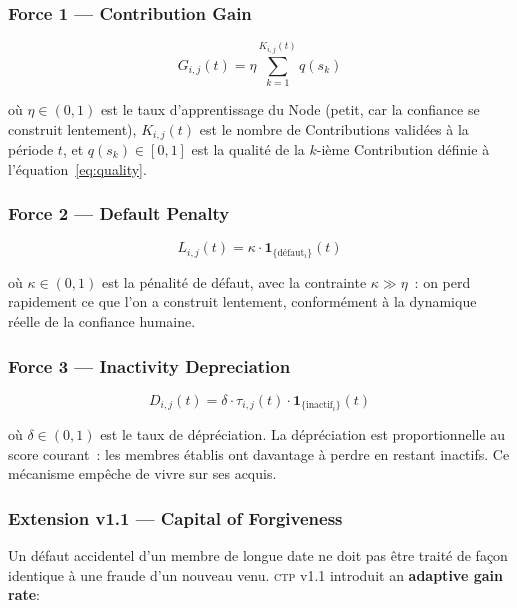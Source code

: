 \documentclass[12pt,a4paper]{article}
\theoremstyle{definition}
\theoremstyle{plain}
\theoremstyle{remark}
\newcommand{\CTP}{\textsc{ctp}}
\newcommand{\trustscore}{\tau}
\newcommand{\1}{\mathbf{1}}
\begin{document}
\subsubsection{Force 1 --- Contribution Gain}

\begin{equation}
G_{i,j}(t) = \eta \sum_{k=1}^{K_{i,j}(t)} q(s_k)
\label{eq:gain}
\end{equation}

où $\eta \in (0,1)$ est le taux d'apprentissage du Node (petit, car la
confiance se construit lentement), $K_{i,j}(t)$ est le nombre de Contributions
validées à la période $t$, et $q(s_k) \in [0,1]$ est la qualité de la
$k$-ième Contribution définie à l'équation~\eqref{eq:quality}.

\subsubsection{Force 2 --- Default Penalty}

\begin{equation}
L_{i,j}(t) = \kappa \cdot \1_{\{\text{défaut}_i\}}(t)
\label{eq:loss}
\end{equation}

où $\kappa \in (0,1)$ est la pénalité de défaut, avec la contrainte
$\kappa \gg \eta$~: on perd rapidement ce que l'on a construit lentement,
conformément à la dynamique réelle de la confiance humaine.

\subsubsection{Force 3 --- Inactivity Depreciation}

\begin{equation}
D_{i,j}(t) = \delta \cdot \trustscore_{i,j}(t) \cdot \1_{\{\text{inactif}_i\}}(t)
\label{eq:depreciation}
\end{equation}

où $\delta \in (0,1)$ est le taux de dépréciation. La dépréciation est
proportionnelle au score courant~: les membres établis ont davantage à perdre
en restant inactifs. Ce mécanisme empêche de vivre sur ses acquis.

\subsubsection{Extension v1.1 --- Capital of Forgiveness}

Un défaut accidentel d'un membre de longue date ne doit pas être traité
de façon identique à une fraude d'un nouveau venu. \CTP{} v1.1 introduit
an \textbf{adaptive gain rate}:
\end{document}
